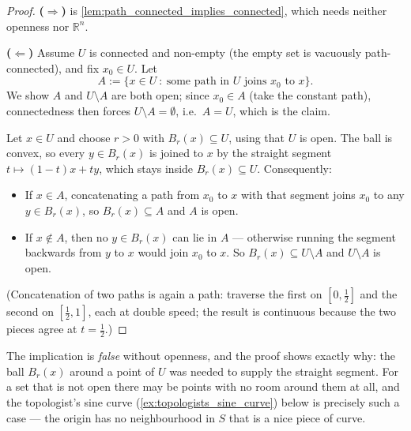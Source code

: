 \begin{proof}
\textbf{($\Rightarrow$)} is \cref{lem:path_connected_implies_connected}, which needs neither
openness nor $\mathbb{R}^n$.

\textbf{($\Leftarrow$)} Assume $U$ is connected and non-empty (the empty set is vacuously
path-connected), and fix $x_0 \in U$. Let
\[A := \{x \in U \ :\ \text{some path in } U \text{ joins } x_0 \text{ to } x\}.\]
We show $A$ and $U \setminus A$ are both open; since $x_0 \in A$ (take the constant path),
connectedness then forces $U\setminus A = \emptyset$, i.e.\ $A = U$, which is the claim.

Let $x \in U$ and choose $r>0$ with $B_r(x) \subseteq U$, using that $U$ is open. The ball is
convex, so every $y \in B_r(x)$ is joined to $x$ by the straight segment
$t \mapsto (1-t)x+ty$, which stays inside $B_r(x) \subseteq U$. Consequently:
\begin{itemize}
  \item If $x \in A$, concatenating a path from $x_0$ to $x$ with that segment joins $x_0$ to
    any $y \in B_r(x)$, so $B_r(x) \subseteq A$ and $A$ is open.
  \item If $x \notin A$, then no $y \in B_r(x)$ can lie in $A$ --- otherwise running the segment
    backwards from $y$ to $x$ would join $x_0$ to $x$. So $B_r(x) \subseteq U\setminus A$ and
    $U\setminus A$ is open.
\end{itemize}
(Concatenation of two paths is again a path: traverse the first on $[0,\tfrac12]$ and the second
on $[\tfrac12,1]$, each at double speed; the result is continuous because the two pieces agree
at $t=\tfrac12$.)
\end{proof}

\begin{importantremark}
\label{rem:path_connected_needs_open}
The implication  is \emph{false} without openness,
and the proof shows exactly why: the ball $B_r(x)$ around a point of $U$ was needed to supply
the straight segment. For a set that is not open there may be points with no room around them at
all, and the topologist's sine curve (\cref{ex:topologists_sine_curve}) below is precisely such
a case --- the origin has no neighbourhood in $S$ that is a nice piece of curve.
\end{importantremark}

